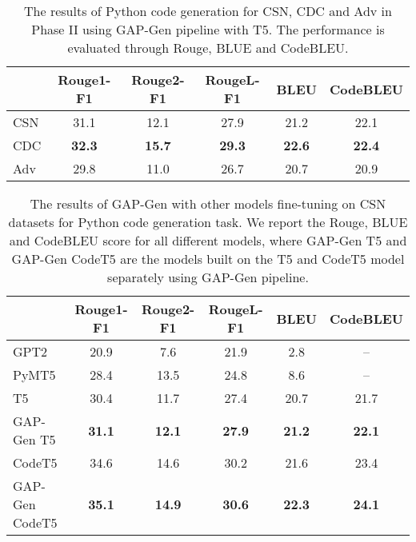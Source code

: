 \documentclass[11pt]{article}
\begin{document}
\begin{table*}[ht]
\centering
\begin{tabular}{|l|c|c|c|c|c|}
\hline
             & Rouge1-F1 & Rouge2-F1 & RougeL-F1  & BLEU    & CodeBLEU    \\ \hline
CSN          & 31.1  & 12.1  & 27.9   & 21.2   & 22.1       \\ \hline
CDC          & \textbf{32.3}  & \textbf{15.7}  & \textbf{29.3}   & \textbf{22.6}   & \textbf{22.4}       \\ \hline
Adv          & 29.8  & 11.0  & 26.7   & 20.7   & 20.9       \\ \hline
\end{tabular}
\caption{The results of Python code generation for CSN, CDC and Adv in Phase II using GAP-Gen pipeline with T5. The performance is evaluated through Rouge, BLUE and CodeBLEU.}
\label{Phase_II}
\end{table*}
\begin{table*}[ht]
\centering

\begin{tabular}{|l|c|c|c|c|c|}
\hline
                                   & Rouge1-F1    & Rouge2-F1     & RougeL-F1  & BLEU   & CodeBLEU \\ \hline
GPT2 \citep{Clement2020PyMT5MT}    & 20.9      & 7.6        & 21.9    & 2.8    & --       \\ \hline
PyMT5 \citep{Clement2020PyMT5MT}   & 28.4      & 13.5       & 24.8    & 8.6   & --       \\ \hline
T5           & 30.4   & 11.7   & 27.4   & 20.7  & 21.7         \\ \hline
GAP-Gen T5  & \textbf{31.1}  & \textbf{12.1}  & \textbf{27.9}   & \textbf{21.2}   & \textbf{22.1}         \\ \hline
CodeT5 \citep{wang2021codet5}      & 34.6     & 14.6      & 30.2        & 21.6      &  23.4      \\ \hline
GAP-Gen CodeT5   & \textbf{35.1}     & \textbf{14.9}      & \textbf{30.6}        & \textbf{22.3}      & \textbf{24.1}        \\ \hline
\end{tabular}
\caption{The results of GAP-Gen with other models fine-tuning on CSN datasets for Python code generation task. We report the Rouge, BLUE and CodeBLEU score for all different models, where GAP-Gen T5 and GAP-Gen CodeT5 are the models built on the T5 and CodeT5 model separately using GAP-Gen pipeline.
}
\label{other_results}
\end{table*}
\end{document}
